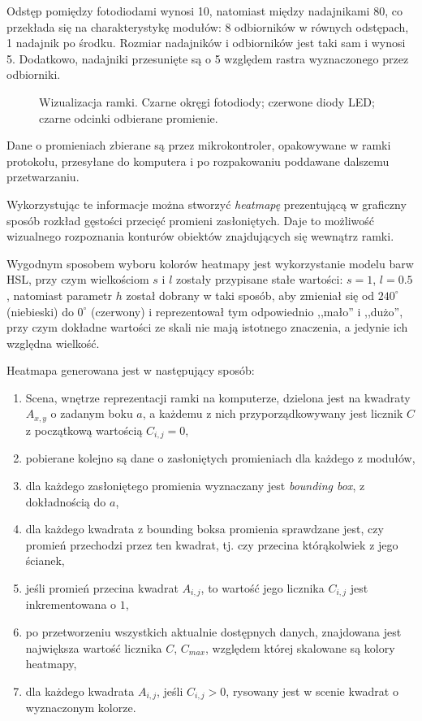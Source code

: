 Odstęp pomiędzy fotodiodami wynosi 10, natomiast między nadajnikami 80, co przekłada się na charakterystykę modułów: 8 odbiorników w równych odstępach, 1 nadajnik po środku. Rozmiar nadajników i odbiorników jest taki sam i wynosi 5. Dodatkowo, nadajniki przesunięte są o 5 względem rastra wyznaczonego przez odbiorniki.\\

\begin{figure}
 \centering
 \makebox[\textwidth][r]{
  \resizebox{.9\largefigure}{!}{
    \def\svgwidth{0.9\largefigure}
    
  }
 }
 \caption{Wizualizacja ramki. Czarne okręgi \ppauza fotodiody; czerwone \ppauza diody LED; czarne odcinki \ppauza odbierane promienie.}
 \label{fig:scene_rays_sample}
\end{figure}

Dane o promieniach zbierane są przez mikrokontroler, opakowywane w ramki protokołu, przesyłane do komputera i po rozpakowaniu poddawane dalszemu przetwarzaniu.

Wykorzystując te informacje można stworzyć \textit{heatmapę} prezentującą w graficzny sposób rozkład gęstości przecięć promieni zasłoniętych. Daje to możliwość wizualnego rozpoznania konturów obiektów znajdujących się wewnątrz ramki.

Wygodnym sposobem wyboru kolorów heatmapy jest wykorzystanie modelu barw HSL, przy czym wielkościom $s$ i $l$ zostały przypisane stałe wartości: $s = 1$, $l = 0.5$, natomiast parametr $h$ został dobrany w taki sposób, aby zmieniał się od $240^{\circ}$ (niebieski) do $0^{\circ}$ (czerwony) i reprezentował tym odpowiednio ,,mało'' i ,,dużo'', przy czym dokładne wartości ze skali nie mają istotnego znaczenia, a jedynie ich względna wielkość.

Heatmapa generowana jest w następujący sposób:
\begin{enumerate}
 \item Scena, wnętrze reprezentacji ramki na komputerze, dzielona jest na kwadraty $A_{x,y}$ o zadanym boku $a$, a każdemu z nich przyporządkowywany jest licznik $C$ z początkową wartością $C_{i,j} = 0$,
 \item pobierane kolejno są dane o zasłoniętych promieniach dla każdego z modułów,
 \item dla każdego zasłoniętego promienia wyznaczany jest \textit{bounding box}, z dokładnością do $a$,
 \item dla każdego kwadrata z bounding boksa promienia sprawdzane jest, czy promień przechodzi przez ten kwadrat, tj. czy przecina którąkolwiek z jego ścianek,
 \item jeśli promień przecina kwadrat $A_{i,j}$, to wartość jego licznika $C_{i,j}$ jest inkrementowana o $1$,
 \item po przetworzeniu wszystkich aktualnie dostępnych danych, znajdowana jest największa wartość licznika $C$, $C_{max}$, względem której skalowane są kolory heatmapy,
 \item dla każdego kwadrata $A_{i,j}$, jeśli $C_{i,j} > 0$, rysowany jest w scenie kwadrat o wyznaczonym kolorze.
\end{enumerate}

